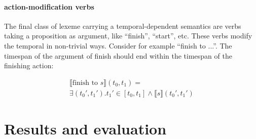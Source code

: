 \documentclass[a4paper,11pt]{article}
\begin{document}
\paragraph{action-modification verbs}

The final class of lexeme carrying a temporal-dependent semantics are
verbs taking a proposition as argument, like ``finish'', ``start'',
etc. These verbs modify the temporal in non-trivial ways. Consider for
example ``finish to ...''. The timespan of the argument of finish
should end within the timespan of the finishing action:

\begin{multline*}
⟦\text{finish to \(s\)}⟧(t_0,t_1) = \\ ∃(t_0',t_1'). t_1' ∈ [t_0,t_1] ∧ ⟦s⟧(t_0',t_1')
\end{multline*}
\section{Results and evaluation}
\providecommand\ncases[1]{{\ensuremath{^{#1}}}}
\end{document}
